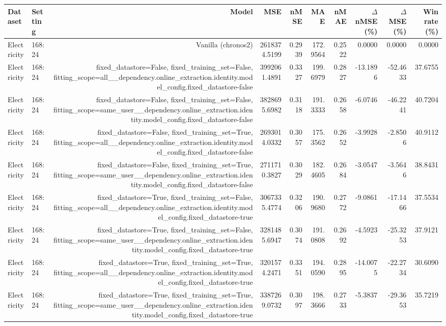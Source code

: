 \begin{tabular}{llrrrrrrrr}
\toprule
Dataset & Setting & Model & MSE & nMSE & MAE & nMAE & $\Delta$ nMSE (\%) & $\Delta$ MSE (\%) & Win rate (\%) \\
\midrule
Electricity & 168:24 & Vanilla (chronos2) & 2618374.5199 & 0.2939 & 172.9564 & 0.2522 & 0.0000 & 0.0000 & 0.0000 \\
Electricity & 168:24 & fixed\_datastore=False, fixed\_training\_set=False, fitting\_scope=all\_\_dependency.online\_extraction.identity.model\_config.fixed\_datastore-false & 3992061.4891 & 0.3327 & 199.6979 & 0.2827 & -13.1896 & -52.4633 & 37.6755 \\
Electricity & 168:24 & fixed\_datastore=False, fixed\_training\_set=False, fitting\_scope=same\_user\_\_dependency.online\_extraction.identity.model\_config.fixed\_datastore-false & 3828695.6982 & 0.3118 & 191.3333 & 0.2658 & -6.0746 & -46.2241 & 40.7204 \\
Electricity & 168:24 & fixed\_datastore=False, fixed\_training\_set=True, fitting\_scope=all\_\_dependency.online\_extraction.identity.model\_config.fixed\_datastore-false & 2693014.0332 & 0.3057 & 175.3562 & 0.2652 & -3.9928 & -2.8506 & 40.9112 \\
Electricity & 168:24 & fixed\_datastore=False, fixed\_training\_set=True, fitting\_scope=same\_user\_\_dependency.online\_extraction.identity.model\_config.fixed\_datastore-false & 2711710.3827 & 0.3029 & 182.4605 & 0.2684 & -3.0547 & -3.5646 & 38.8431 \\
Electricity & 168:24 & fixed\_datastore=True, fixed\_training\_set=False, fitting\_scope=all\_\_dependency.online\_extraction.identity.model\_config.fixed\_datastore-true & 3067335.4774 & 0.3206 & 190.9680 & 0.2772 & -9.0861 & -17.1466 & 37.5534 \\
Electricity & 168:24 & fixed\_datastore=True, fixed\_training\_set=False, fitting\_scope=same\_user\_\_dependency.online\_extraction.identity.model\_config.fixed\_datastore-true & 3281485.6947 & 0.3074 & 191.0808 & 0.2692 & -4.5923 & -25.3253 & 37.9121 \\
Electricity & 168:24 & fixed\_datastore=True, fixed\_training\_set=True, fitting\_scope=all\_\_dependency.online\_extraction.identity.model\_config.fixed\_datastore-true & 3201574.2471 & 0.3351 & 194.0590 & 0.2895 & -14.0075 & -22.2734 & 30.6090 \\
Electricity & 168:24 & fixed\_datastore=True, fixed\_training\_set=True, fitting\_scope=same\_user\_\_dependency.online\_extraction.identity.model\_config.fixed\_datastore-true & 3387269.0732 & 0.3097 & 198.3666 & 0.2733 & -5.3837 & -29.3653 & 35.7219 \\

\end{tabular}
